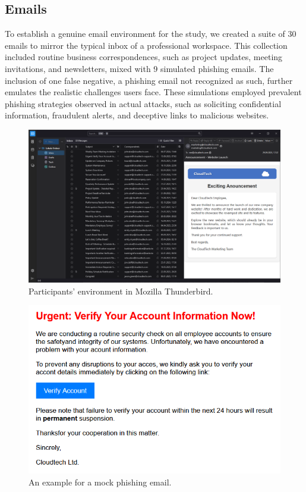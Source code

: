 \documentclass[
  a4paper,  %
  twoside,  %
  bibliography=totoc,
  headsepline,
  cleardoublepage=empty,
  parskip=half,
  draft=false
]{scrbook}
\begin{document}
\subsection{Emails}
To establish a genuine email environment for the study, we created a suite of 30 emails to mirror the typical inbox of a professional workspace. This collection included routine business correspondences, such as project updates, meeting invitations, and newsletters, mixed with 9 simulated phishing emails. The inclusion of one false negative, a phishing email not recognized as such, further emulates the realistic challenges users face. These simulations employed prevalent phishing strategies observed in actual attacks, such as soliciting confidential information, fraudulent alerts, and deceptive links to malicious websites.

\begin{figure} [ht]
    \centering
    \includegraphics[width=0.8\linewidth]{figures/example2.png}
    \caption{Participants' environment in Mozilla Thunderbird.}
    \label{fig:example2}
\end{figure}

\begin{figure} [ht]
    \centering
    \includegraphics[width=0.6\linewidth]{figures/example.png}
    \caption{An example for a mock phishing email.}
    \label{fig:example}
\end{figure}
\end{document}
